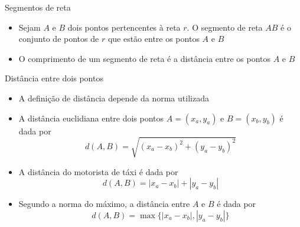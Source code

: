 \begin{frame}[fragile]{Segmentos de reta}

    \begin{itemize}
        \item Sejam $A$ e $B$ dois pontos pertencentes à reta $r$. O segmento de reta $AB$ é o conjunto de pontos de $r$ que estão entre os pontos $A$ e $B$
        \pause

        \item O comprimento de um segmento de reta é a distância entre os pontos $A$ e $B$
        \pause
    \end{itemize}

    \begin{center}
    \end{center}

\end{frame}

\begin{frame}[fragile]{Distância entre dois pontos}

    \begin{itemize}
        \item A definição de distância depende da norma utilizada
        \pause

        \item A distância euclidiana entre dois pontos $A = (x_a, y_a)$ e $B = (x_b, y_b)$ é dada por
        \[
            d(A, B) = \sqrt{(x_a - x_b)^2 + (y_a - y_b)^2}
        \]
        \pause

        \item A distância do motorista de táxi é dada por
        \[
            d(A, B) = |x_a - x_b| + |y_a - y_b|
        \]
        \pause

        \item Segundo a norma do máximo, a distância entre $A$ e $B$ é dada por
        \[
            d(A, B) = \max\lbrace |x_a - x_b|, |y_a - y_b|\rbrace
        \]
    \end{itemize}

\end{frame}

